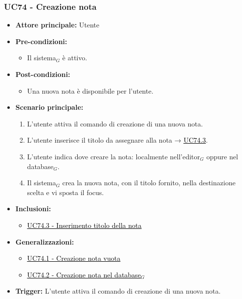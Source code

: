\documentclass[a4paper, 10pt]{article}
\newcommand{\uclink}[2]{\hyperlink{#1}{\textcolor{black}{\underline{#2}}}}
\begin{document}
\subsubsection{UC74 - Creazione nota}
\hypertarget{uc:74}{}
\begin{itemize}
    \item \textbf{Attore principale:} Utente
    \item \textbf{Pre-condizioni:}
        \begin{itemize}
            \item Il sistema$_G$ è attivo.
        \end{itemize}
    \item \textbf{Post-condizioni:}
        \begin{itemize}
            \item Una nuova nota è disponibile per l'utente.
        \end{itemize}
    \item \textbf{Scenario principale:}
        \begin{enumerate}
            \item L'utente attiva il comando di creazione di una nuova nota.
            \item L'utente inserisce il titolo da assegnare alla nota → \uclink{uc:74.3}{UC74.3}.
            \item L'utente indica dove creare la nota: localmente nell'editor$_G$ oppure nel database$_G$.
            \item Il sistema$_G$ crea la nuova nota, con il titolo fornito, nella destinazione scelta e vi sposta il focus.
        \end{enumerate}
    \item \textbf{Inclusioni:}
        \begin{itemize}
            \item \uclink{uc:74.3}{UC74.3 - Inserimento titolo della nota}
        \end{itemize}
    \item \textbf{Generalizzazioni:}
        \begin{itemize}
            \item \uclink{uc:74.1}{UC74.1 - Creazione nota vuota}
            \item \uclink{uc:74.2}{UC74.2 - Creazione nota nel database$_G$}
        \end{itemize}
    \item \textbf{Trigger:} L'utente attiva il comando di creazione di una nuova nota.
\end{itemize}
\end{document}
